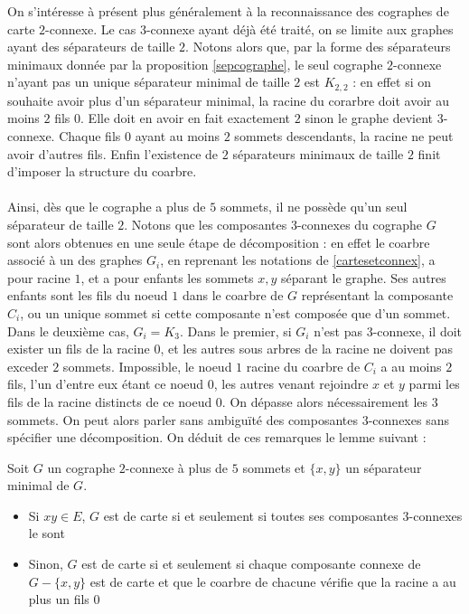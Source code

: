 \documentclass{scrartcl}
\begin{document}
\begin{flushleft}
On s'intéresse à présent plus généralement à la reconnaissance des cographes de carte $2$-connexe. Le cas $3$-connexe ayant déjà été traité,
on se limite aux graphes ayant des séparateurs de taille $2$. Notons alors que, par la forme des séparateurs minimaux donnée par la proposition
\ref{sepcographe}, le seul cographe $2$-connexe n'ayant pas un unique séparateur minimal de taille $2$ est $K_{2,2}$ : en effet si on souhaite avoir
plus d'un séparateur minimal, la racine du corarbre doit avoir au moins $2$ fils $0$. Elle doit en avoir en fait exactement $2$ sinon le
graphe devient $3$-connexe. Chaque fils $0$ ayant au moins $2$ sommets descendants, la racine ne peut avoir d'autres fils. Enfin l'existence
de $2$ séparateurs minimaux de taille $2$ finit d'imposer la structure du coarbre.
\\~\\
Ainsi, dès que le cographe a plus de $5$ sommets, il ne possède qu'un seul séparateur de taille $2$. Notons que les composantes $3$-connexes
du cographe $G$ sont alors obtenues en une seule étape de décomposition : en effet le coarbre associé à un des graphes $G_i$, en reprenant
les notations de \ref{cartesetconnex}, a pour racine $1$, et a pour enfants les sommets $x,y$ séparant le graphe.
Ses autres enfants sont les fils du noeud $1$ dans le coarbre de $G$ représentant la composante $C_i$, ou un unique sommet si
cette composante n'est composée que d'un sommet. Dans le deuxième cas, $G_i = K_3$. Dans le premier, si $G_i$ n'est pas $3$-connexe,
il doit exister un fils de la racine $0$, et les autres sous arbres de la racine ne doivent pas exceder $2$ sommets. Impossible,
le noeud $1$ racine du coarbre de $C_i$ a au moins $2$ fils, l'un d'entre eux étant ce noeud $0$, les autres venant rejoindre $x$ et $y$
parmi les fils de la racine distincts de ce noeud $0$. On dépasse alors nécessairement les $3$ sommets. On peut alors parler sans ambiguïté
des composantes $3$-connexes sans spécifier une décomposition. On déduit de ces remarques le lemme suivant :

\begin{theorem}
    Soit $G$ un cographe $2$-connexe à plus de $5$ sommets et $\{x,y\}$ un séparateur minimal de $G$. 
    \begin{itemize}
        \item Si $xy \in E$, $G$ est de carte si et seulement si toutes ses composantes $3$-connexes le sont
        \item Sinon, $G$ est de carte si et seulement si chaque composante connexe de $G - \{x,y\}$ est de carte et que
        le coarbre de chacune vérifie que la racine a au plus un fils $0$
    \end{itemize}
\end{theorem}


\end{flushleft}
\end{document}
